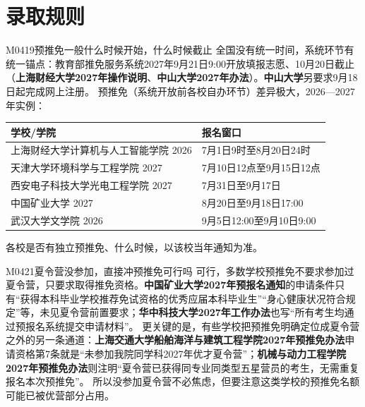 \section{录取规则}
\begin{qa}{M0419}{预推免一般什么时候开始，什么时候截止}
全国没有统一时间，系统环节有统一锚点：教育部推免服务系统2027年9月21日9:00开放填报志愿、10月20日截止（\textbf{上海财经大学2027年操作说明}、\textbf{中山大学2027年办法}）。\textbf{中山大学}另要求9月18日起完成网上注册。
预推免（系统开放前各校自办环节）差异极大，2026—2027年实例：
\par\vspace{2pt}\nobreak\begin{center}\footnotesize
\begin{tabularx}{\textwidth}{>{\raggedright\arraybackslash}X>{\raggedright\arraybackslash}X}
\toprule
\textbf{学校/学院} & \textbf{报名窗口} \\ \midrule
上海财经大学计算机与人工智能学院 2026 & 7月1日9时至8月20日24时 \\
天津大学环境科学与工程学院 2027 & 7月10日12点至9月15日12点 \\
西安电子科技大学光电工程学院 2027 & 7月31日至9月17日 \\
中国矿业大学 2027 & 8月20日至9月18日17:00 \\
武汉大学文学院 2026 & 9月5日12:00至9月10日9:00 \\
\bottomrule
\end{tabularx}
\end{center}\vspace{2pt}\par
各校是否有独立预推免、什么时候，以该校当年通知为准。
\end{qa}

\begin{qa}{M0421}{夏令营没参加，直接冲预推免可行吗}
可行，多数学校预推免不要求参加过夏令营，只要求取得推免资格。\textbf{中国矿业大学2027年预报名通知}的申请条件只有“获得本科毕业学校推荐免试资格的优秀应届本科毕业生”“身心健康状况符合规定”等，未见夏令营前置要求；\textbf{华中科技大学2027年工作办法}也写“所有考生均通过预报名系统提交申请材料”。
更关键的是，有些学校把预推免明确定位成夏令营之外的另一条通道：\textbf{上海交通大学船舶海洋与建筑工程学院2027年预推免办法}申请资格第7条就是“未参加我院同学科2027年优才夏令营”；\textbf{机械与动力工程学院2027年预推免办法}则注明“夏令营已获得同专业同类型五星营员的考生，无需重复报名本次预推免”。
所以没参加夏令营不必焦虑，但要注意这类学校的预推免名额可能已被优营部分占用。
\end{qa}

